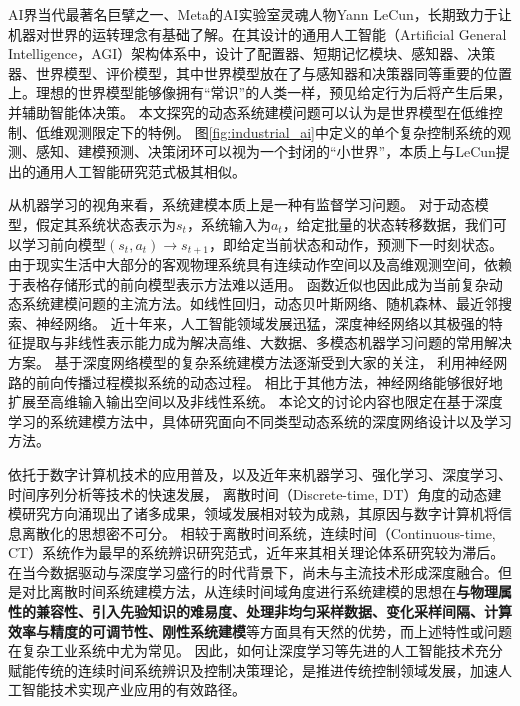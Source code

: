 AI界当代最著名巨擘之一、Meta的AI实验室灵魂人物Yann LeCun，长期致力于让机器对世界的运转理念有基础了解。在其设计的通用人工智能（Artificial General Intelligence，AGI）架构体系中，设计了配置器、短期记忆模块、感知器、决策器、世界模型、评价模型，其中世界模型放在了与感知器和决策器同等重要的位置上。理想的世界模型能够像拥有“常识”的人类一样，预见给定行为后将产生后果，并辅助智能体决策。
本文探究的动态系统建模问题可以认为是世界模型在低维控制、低维观测限定下的特例。
图\ref{fig:industrial_ai}中定义的单个复杂控制系统的观测、感知、建模预测、决策闭环可以视为一个封闭的“小世界”，本质上与LeCun提出的通用人工智能研究范式极其相似。

从机器学习的视角来看，系统建模本质上是一种有监督学习问题\cite{jordan1992forward}。
对于动态模型，假定其系统状态表示为$s_t$，系统输入为$a_t$，给定批量的状态转移数据，我们可以学习前向模型$\left(s_t, a_t\right) \rightarrow s_{t+1}$，即给定当前状态和动作，预测下一时刻状态。
由于现实生活中大部分的客观物理系统具有连续动作空间以及高维观测空间，依赖于表格存储形式的前向模型表示方法难以适用。
函数近似也因此成为当前复杂动态系统建模问题的主流方法。如线性回归\cite{silver2008sample}，动态贝叶斯网络、随机森林、最近邻搜索、神经网络\cite{werbos1989neural}。
近十年来，人工智能领域发展迅猛，深度神经网络以其极强的特征提取与非线性表示能力成为解决高维、大数据、多模态机器学习问题的常用解决方案。
基于深度网络模型的复杂系统建模方法逐渐受到大家的关注，
利用神经网路的前向传播过程模拟系统的动态过程\cite{temeng1995model, tan1996nonlinear}。
相比于其他方法，神经网络能够很好地扩展至高维输入输出空间以及非线性系统。
本论文的讨论内容也限定在基于深度学习的系统建模方法中，具体研究面向不同类型动态系统的深度网络设计以及学习方法。


依托于数字计算机技术的应用普及，以及近年来机器学习、强化学习\cite{sutton2018reinforcement}、深度学习\cite{lecun2015deep}\cite{duan2016}、时间序列分析等技术\cite{shumway2000time}的快速发展，
离散时间（Discrete-time, DT）角度的动态建模研究方向涌现出了诸多成果，领域发展相对较为成熟，其原因与数字计算机将信息离散化的思想密不可分。
相较于离散时间系统，连续时间（Continuous-time, CT）系统作为最早的系统辨识研究范式，近年来其相关理论体系研究较为滞后。在当今数据驱动与深度学习盛行的时代背景下，尚未与主流技术形成深度融合。但是对比离散时间系统建模方法，从连续时间域角度进行系统建模的思想在\textbf{与物理属性的兼容性、引入先验知识的难易度、处理非均匀采样数据、变化采样间隔、计算效率与精度的可调节性、刚性系统建模}等方面具有天然的优势，而上述特性或问题在复杂工业系统中尤为常见。
因此，如何让深度学习等先进的人工智能技术充分赋能传统的连续时间系统辨识及控制决策理论，是推进传统控制领域发展，加速人工智能技术实现产业应用的有效路径。

